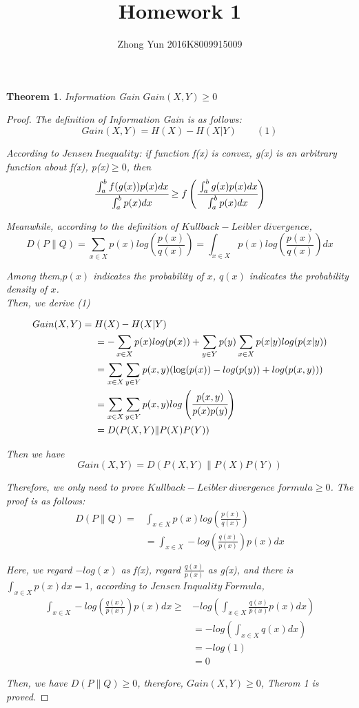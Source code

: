\documentclass{article} %
\title{Homework 1}
\author{Zhong Yun 2016K8009915009}
\newtheorem{theorem}{Theorem}
\newtheorem{proof}{Proof}
\begin{document}
\maketitle
%


% 
%

\begin{theorem}
Information Gain $Gain(X,Y)\ge 0$
\end{theorem}
\begin{proof}
\emph{The definition of Information Gain is as follows:}
\[Gain(X,Y) = H(X)-H(X|Y)\qquad (1)\]

\emph{According to $Jensen\ Inequality$: if function f(x) is convex, g(x) is an arbitrary function about f(x), p(x)$\ge0$, then} 
\[{\cfrac{\int_a^b f(g(x))p(x)dx}{\int_a^b p(x)dx}\ge f\left(\cfrac{\int_a^bg(x)p(x)dx}{\int_a^bp(x)dx}\right)}\]

\emph{Meanwhile, according to the definition of $Kullback-Leibler\ divergence$,}
\[D(P\|Q) = \sum_{x\in X}p(x)log\left(\frac{p(x)}{q(x)}\right) = \int_{x\in X}p(x)log\left(\frac{p(x)}{q(x)}\right)dx\]


\emph{Among them,$p(x)$ indicates the probability of $x$, $q(x)$ indicates the probability density of $x$.\\Then, we derive (1)}

\[\begin{aligned}
Gain(X,Y) ={}& H(X)-H(X|Y){} \\
& = -\sum_{x\in X}p(x)log(p(x))+\sum_{y\in Y}p(y)\sum_{x\in X}p(x|y)log(p(x|y))\\
& = \sum_{x\in X}\sum_{y\in Y}p(x,y)(\log(p(x))-log(p(y))+log(p(x,y)))\\
& = \sum_{x\in X}\sum_{y\in Y}p(x,y)log\left(\cfrac{p(x,y)}{p(x)p(y)}\right)\\
& = D(P(X,Y)\|P(X)P(Y))
\end{aligned}\]


\emph{Then we have}
\[Gain(X,Y) = D(P(X,Y)\|P(X)P(Y))\]


\emph{Therefore, we only need to prove $Kullback-Leibler\ divergence\ formula\ge 0$. The proof is as follows:}
\[\begin{aligned}
D(P\|Q) ={}& \int_{x\in X}p(x)log\left(\frac{p(x)}{q(x)}\right){} \\
& =\int_{x\in X}-log\left(\frac{q(x)}{p(x)}\right)p(x)dx
\end{aligned}\]


\emph{Here, we regard $-log(x)$ as f(x), regard $\frac{q(x)}{p(x)}$ as g(x), and there is $\int_{x\in X}p(x)dx = 1$, according to $Jensen\ Inquality\ Formula$,}
\[\begin{aligned}
\int_{x\in X}-log\left(\frac{q(x)}{p(x)}\right)p(x)dx \ge {}&-log\left(\int_{x\in X}\frac{q(x)}{p(x)}p(x)dx\right){} \\
& = -log\left(\int_{x\in X}q(x)dx\right)\\
& = -log(1) \\
& = 0
\end{aligned}\]

\emph{Then, we have $D(P\|Q) \ge 0$, therefore, $Gain(X,Y) \ge 0$, Therom 1 is proved.}
\end{proof}
\end{document}
